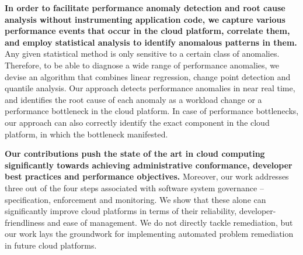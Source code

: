 \textbf{In order to facilitate performance anomaly detection and root cause analysis without instrumenting
application code, we capture various performance events that occur in the cloud platform,
correlate them, and employ statistical analysis to identify anomalous patterns in them.} Any given statistical
method is only sensitive to a certain class of anomalies. Therefore, to be able to diagnose a wide range of
performance anomalies, we devise an algorithm that combines linear regression, change point
detection and quantile analysis. Our approach detects performance anomalies in near real time,
and identifies the root cause of each anomaly as a workload change or a performance bottleneck
in the cloud platform. In case of performance bottlenecks, our approach can also correctly identify
the exact component in the cloud platform, in which the bottleneck manifested.

\textbf{Our contributions push the state of the art in cloud computing significantly towards achieving
administrative conformance, developer best practices and performance objectives.} Moreover,
our work addresses three out of the four steps associated with software system governance --
specification, enforcement and monitoring. We show that these alone can significantly improve cloud platforms
in terms of their reliability, developer-friendliness and ease of management. 
We do not directly tackle remediation, but our work
lays the groundwork for implementing automated problem remediation in future cloud platforms.